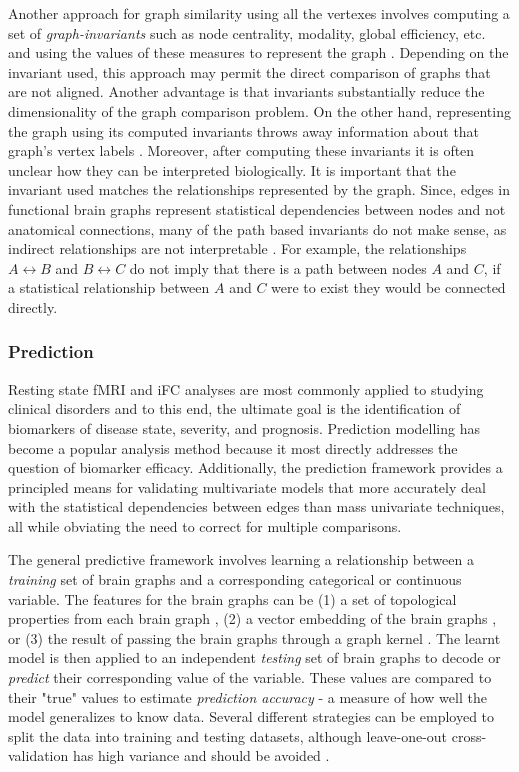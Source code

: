 Another approach for graph similarity using all the vertexes involves computing
a set of \emph{graph-invariants} such as node centrality, modality, global
efficiency, etc. and using the values of these measures to represent the graph
\cite{rubinov}\cite{bullmoreReview}. Depending on the invariant used, this
approach may permit the direct comparison of graphs that are not aligned.
Another advantage is that invariants substantially reduce the dimensionality of
the graph comparison problem. On the other hand, representing the graph using
its computed invariants throws away information about that graph's vertex
labels \cite{Vogelstein2012}. Moreover, after computing these invariants it is
often unclear how they can be interpreted biologically. It is important that
the invariant used matches the relationships represented by the graph. Since,
edges in functional brain graphs represent statistical dependencies between
nodes and not anatomical connections, many of the path based invariants do not
make sense, as indirect relationships are not interpretable \cite{}. For
example, the relationships $A \leftrightarrow B$ and $B \leftrightarrow C$ do
not imply that there is a path between nodes $A$ and $C$, if a statistical
relationship between $A$ and $C$ were to exist they would be connected
directly.   

\subsubsection{Prediction}

Resting state fMRI and iFC analyses are most commonly applied to studying
clinical disorders and to this end, the ultimate goal is the identification of
biomarkers of disease state, severity, and prognosis\cite{DiMartino}. Prediction
 modelling has become a popular analysis method because it most
directly addresses the question of biomarker
efficacy\cite{craddock,Dosenbach,review}. Additionally, the prediction
framework provides a principled means for validating multivariate models that
more accurately deal with the statistical dependencies between edges than mass
univariate techniques, all while obviating the need to correct for multiple
comparisons. 

The general predictive framework involves learning a relationship between a
\emph{training} set of brain graphs and a corresponding categorical or
continuous variable. The features for the brain graphs can be (1) a set of
topological properties from each brain graph \cite{Cecci2009, Bassett2012}, (2)
a vector embedding of the brain graphs \cite{Richiadi2013,Luo2003, Craddock2009}, or (3) the
result of passing the brain graphs through a graph kernel \cite{}. The learnt
model is then applied to an independent \emph{testing} set of brain graphs to
decode or \emph{predict} their corresponding value of the variable. These
values are compared to their "true" values to estimate \emph{prediction
accuracy} - a measure of how well the model generalizes to know data. Several
different strategies can be employed to split the data into training and
testing datasets, although leave-one-out cross-validation has high variance and
should be avoided \cite{}. 

